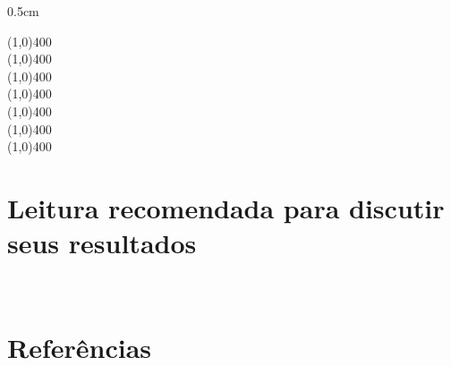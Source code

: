\begin{refsection}
\begin {myindentpar}{0.5cm}
\begin{enumerate}[\itshape 1.]
\line(1,0){400}\\
\line(1,0){400}\\
\line(1,0){400}\\
\line(1,0){400}\\
\line(1,0){400}\\
\line(1,0){400}\\
\line(1,0){400}\\

\end{enumerate}
\end{myindentpar}


\section{Leitura recomendada para discutir seus resultados}\label{tut8:reading}

\\


\section{Referências}\label{tut8:refs}
\printbibliography[heading=none]
\end{refsection}
%  
